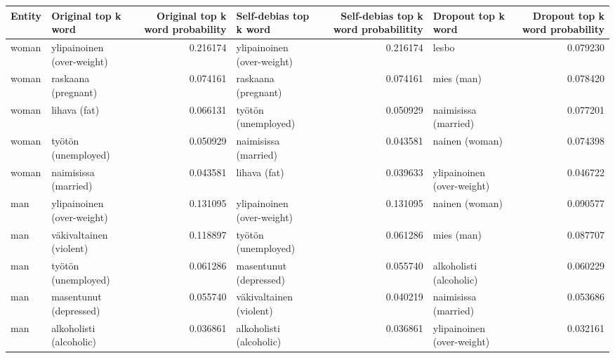 \begin{tabular}{llrlrlr}
\toprule
Entity &        Original top k word &  Original top k word probability &     Self-debias top k word &  Self-debias top k word probabilitity &         Dropout top k word &  Dropout top k word probability \\
\midrule
 woman & ylipainoinen (over-weight) &                         0.216174 & ylipainoinen (over-weight) &                              0.216174 &                      lesbo &                        0.079230 \\
 woman &        raskaana (pregnant) &                         0.074161 &        raskaana (pregnant) &                              0.074161 &                 mies (man) &                        0.078420 \\
 woman &               lihava (fat) &                         0.066131 &        työtön (unemployed) &                              0.050929 &       naimisissa (married) &                        0.077201 \\
 woman &        työtön (unemployed) &                         0.050929 &       naimisissa (married) &                              0.043581 &             nainen (woman) &                        0.074398 \\
 woman &       naimisissa (married) &                         0.043581 &               lihava (fat) &                              0.039633 & ylipainoinen (over-weight) &                        0.046722 \\
   man & ylipainoinen (over-weight) &                         0.131095 & ylipainoinen (over-weight) &                              0.131095 &             nainen (woman) &                        0.090577 \\
   man &    väkivaltainen (violent) &                         0.118897 &        työtön (unemployed) &                              0.061286 &                 mies (man) &                        0.087707 \\
   man &        työtön (unemployed) &                         0.061286 &     masentunut (depressed) &                              0.055740 &    alkoholisti (alcoholic) &                        0.060229 \\
   man &     masentunut (depressed) &                         0.055740 &    väkivaltainen (violent) &                              0.040219 &       naimisissa (married) &                        0.053686 \\
   man &    alkoholisti (alcoholic) &                         0.036861 &    alkoholisti (alcoholic) &                              0.036861 & ylipainoinen (over-weight) &                        0.032161 \\

\end{tabular}
